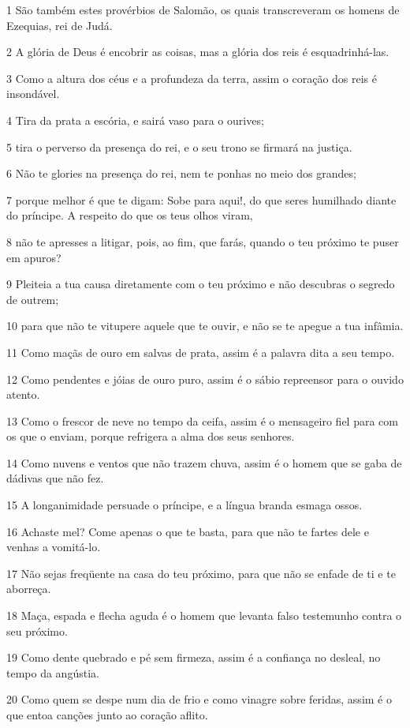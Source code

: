 \par 1 São também estes provérbios de Salomão, os quais transcreveram os homens de Ezequias, rei de Judá.
\par 2 A glória de Deus é encobrir as coisas, mas a glória dos reis é esquadrinhá-las.
\par 3 Como a altura dos céus e a profundeza da terra, assim o coração dos reis é insondável.
\par 4 Tira da prata a escória, e sairá vaso para o ourives;
\par 5 tira o perverso da presença do rei, e o seu trono se firmará na justiça.
\par 6 Não te glories na presença do rei, nem te ponhas no meio dos grandes;
\par 7 porque melhor é que te digam: Sobe para aqui!, do que seres humilhado diante do príncipe. A respeito do que os teus olhos viram,
\par 8 não te apresses a litigar, pois, ao fim, que farás, quando o teu próximo te puser em apuros?
\par 9 Pleiteia a tua causa diretamente com o teu próximo e não descubras o segredo de outrem;
\par 10 para que não te vitupere aquele que te ouvir, e não se te apegue a tua infâmia.
\par 11 Como maçãs de ouro em salvas de prata, assim é a palavra dita a seu tempo.
\par 12 Como pendentes e jóias de ouro puro, assim é o sábio repreensor para o ouvido atento.
\par 13 Como o frescor de neve no tempo da ceifa, assim é o mensageiro fiel para com os que o enviam, porque refrigera a alma dos seus senhores.
\par 14 Como nuvens e ventos que não trazem chuva, assim é o homem que se gaba de dádivas que não fez.
\par 15 A longanimidade persuade o príncipe, e a língua branda esmaga ossos.
\par 16 Achaste mel? Come apenas o que te basta, para que não te fartes dele e venhas a vomitá-lo.
\par 17 Não sejas freqüente na casa do teu próximo, para que não se enfade de ti e te aborreça.
\par 18 Maça, espada e flecha aguda é o homem que levanta falso testemunho contra o seu próximo.
\par 19 Como dente quebrado e pé sem firmeza, assim é a confiança no desleal, no tempo da angústia.
\par 20 Como quem se despe num dia de frio e como vinagre sobre feridas, assim é o que entoa canções junto ao coração aflito.
